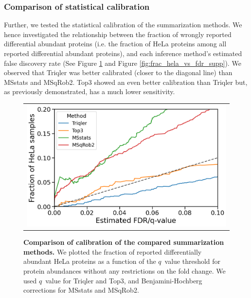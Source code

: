 \documentclass[10pt,letterpaper]{article}
\begin{document}
\subsubsection*{Comparison of statistical calibration}

Further, we tested the statistical calibration of the summarization methods. We hence investigated the relationship between the fraction of wrongly reported differential abundant proteins (i.e. the fraction of HeLa proteins among all reported differential abundant proteins), and each inference method's estimated false discovery rate (See Figure \ref{fig:frac_hela_vs_fdr} and Figure \ref{fig:frac_hela_vs_fdr_supp}). We observed that Triqler was better calibrated (closer to the diagonal line) than MSstats and MSqRob2. Top3 showed an even better calibration than Triqler but, as previously demonstrated, has a much lower sensitivity.



\begin{figure}[hbt]
    \centering
    \begin{tabular}{c} 
        \includegraphics[width=0.5\linewidth]{../../result/report_plots_pipeline/calibration_ID_0.png}
    \end{tabular}
  \caption{{\bf Comparison of calibration of the compared summarization methods.} We plotted the fraction of reported differentially abundant HeLa proteins as a function of the $q$~value threshold for protein abundances without any restrictions on the fold change. We used $q$~value for Triqler and Top3, and Benjamini-Hochberg corrections for MSstats and MSqRob2. \label{fig:frac_hela_vs_fdr}}
\end{figure}
\end{document}
